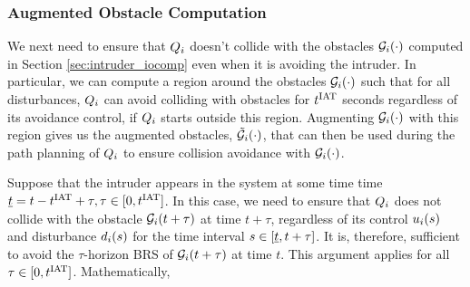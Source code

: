 %
%

\subsubsection{Augmented Obstacle Computation} \label{sec:intruder_aocomp}
We next need to ensure that $Q_i$ doesn't collide with the obstacles $\mathcal{G}_i(\cdot)$ computed in Section \ref{sec:intruder_iocomp} even when it is avoiding the intruder. In particular, we can compute a region around the obstacles $\mathcal{G}_i(\cdot)$ such that for all disturbances, $Q_i$ can avoid colliding with obstacles for $t^\text{IAT}$ seconds regardless of its avoidance control, if $Q_i$ starts outside this region. Augmenting $\mathcal{G}_i(\cdot)$ with this region gives us the augmented obstacles, $\tilde{\mathcal{G}}_i(\cdot)$, that can then be used during the path planning of $Q_i$ to ensure collision avoidance with $\mathcal{G}_i(\cdot)$.  

Suppose that the intruder appears in the system at some time time $\underline{t} = t - t^\text{IAT} + \tau, \tau \in [0, t^\text{IAT}]$. In this case, we need to ensure that $Q_i$ does not collide with the obstacle $\mathcal{G}_i(t + \tau)$ at time $t + \tau$, regardless of its control $u_i(s)$ and disturbance $d_i(s)$ for the time interval $s \in [\underline{t}, t + \tau]$. It is, therefore, sufficient to avoid the $\tau$-horizon BRS of $\mathcal{G}_i(t + \tau)$ at time $t$. This argument applies for all $\tau \in [0, t^\text{IAT}]$. Mathematically,


